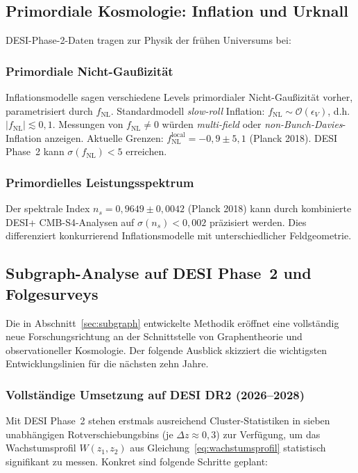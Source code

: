 ﻿\documentclass[a4paper,12pt]{article}
\theoremstyle{definition}
\theoremstyle{remark}
\begin{document}
\subsection{Primordiale Kosmologie: Inflation und Urknall}

DESI-Phase-2-Daten tragen zur Physik der frühen Universums bei:

\subsubsection*{Primordiale Nicht-Gaußizität}
Inflationsmodelle sagen verschiedene Levels primordialer Nicht-Gaußizität
vorher, parametrisiert durch $f_\mathrm{NL}$. Standardmodell \textit{slow-roll}
Inflation: $f_\mathrm{NL} \sim \mathcal{O}(\epsilon_V)$, d.h. $|f_\mathrm{NL}|
\lesssim 0{,}1$. Messungen von $f_\mathrm{NL} \neq 0$ würden \textit{multi-field}
oder \textit{non-Bunch-Davies}-Inflation anzeigen. Aktuelle Grenzen:
$f_\mathrm{NL}^\mathrm{local} = -0{,}9 \pm 5{,}1$ (Planck 2018). DESI Phase~2
kann $\sigma(f_\mathrm{NL}) < 5$ erreichen.

\subsubsection*{Primordielles Leistungsspektrum}
Der spektrale Index $n_s = 0{,}9649 \pm 0{,}0042$ (Planck 2018) kann durch
kombinierte DESI+\- CMB-S4-Analysen auf $\sigma(n_s) < 0{,}002$ präzisiert werden.
Dies differenziert konkurrierend Inflationsmodelle mit unterschiedlicher
Feldgeometrie.

\subsection{Subgraph-Analyse auf DESI Phase~2 und Folgesurveys}
\label{sec:ausblick_subgraph}

Die in Abschnitt~\ref{sec:subgraph} entwickelte Methodik eröffnet eine
vollständig neue Forschungsrichtung an der Schnittstelle von Graphentheorie
und observationeller Kosmologie. Der folgende Ausblick skizziert die
wichtigsten Entwicklungslinien für die nächsten zehn Jahre.

\subsubsection*{Vollständige Umsetzung auf DESI DR2 (2026--2028)}

Mit DESI Phase~2 stehen erstmals ausreichend Cluster-Statistiken in sieben
unabhängigen Rotverschiebungsbins (je $\Delta z \approx 0{,}3$) zur Verfügung,
um das Wachstumsprofil $W(z_1, z_2)$ aus Gleichung~\eqref{eq:wachstumsprofil}
statistisch signifikant zu messen. Konkret sind folgende Schritte geplant:
\end{document}

